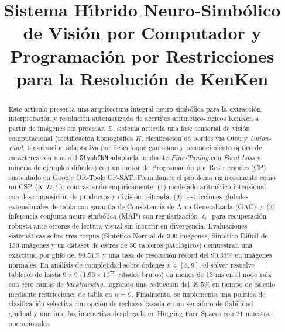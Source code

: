 \documentclass[conference]{IEEEtran}
\begin{document}
\title{Sistema H\'{\i}brido Neuro-Simb\'olico de Visi\'on por Computador y Programaci\'on por Restricciones para la Resoluci\'on de KenKen}

\author{
}

\maketitle

\begin{abstract}
Este art\'{\i}culo presenta una arquitectura integral neuro-simb\'olica para la extracci\'on, interpretaci\'on y resoluci\'on automatizada de acertijos aritm\'etico-l\'ogicos KenKen a partir de im\'agenes sin procesar. El sistema articula una fase sensorial de visi\'on computacional (rectificaci\'on homogr\'afica $H$, clasificaci\'on de bordes v\'{\i}a Otsu y \textit{Union-Find}, binarizaci\'on adaptativa por desenfoque gaussiano y reconocimiento \'optico de caracteres con una red \texttt{GlyphCNN} adaptada mediante \textit{Fine-Tuning} con \textit{Focal Loss} y miner\'{\i}a de ejemplos dif\'{\i}ciles) con un motor de Programaci\'on por Restricciones (CP) sustentado en Google OR-Tools CP-SAT. Formulamos el problema rigurosamente como un CSP $\langle X, D, C \rangle$, contrastando emp\'{\i}ricamente: (1) modelado aritm\'etico intensional con descomposici\'on de productos y divisi\'on reificada, (2) restricciones globales extensionales de tabla con garant\'{\i}a de Consistencia de Arco Generalizada (GAC), y (3) inferencia conjunta neuro-simb\'olica (MAP) con regularizaci\'on $\ell_0$ para recuperaci\'on robusta ante errores de lectura visual sin incurrir en divergencia. Evaluaciones sistem\'aticas sobre tres corpus (Sint\'etico Normal de 300 im\'agenes, Sint\'etico Dif\'{\i}cil de 150 im\'agenes y un dataset de estr\'es de 50 tableros patol\'ogicos) demuestran una exactitud por glifo del $99.51\%$ y una tasa de resoluci\'on r\'ecord del $90.33\%$ en im\'agenes normales. En an\'alisis de complejidad sobre \'ordenes $n \in [3, 9]$, el solver resuelve tableros de hasta $9 \times 9$ ($1.96 \times 10^{77}$ estados brutos) en menos de $13\text{ ms}$ en el nodo ra\'{\i}z con cero ramas de \textit{backtracking}, logrando una reducci\'on del $39.5\%$ en tiempo de c\'alculo mediante restricciones de tabla en $n=9$. Finalmente, se implementa una pol\'{\i}tica de clasificaci\'on selectiva con opci\'on de rechazo basada en un sem\'aforo de fiabilidad gradual y una interfaz interactiva desplegada en Hugging Face Spaces con 21 muestras operacionales.
\end{abstract}
\end{document}
